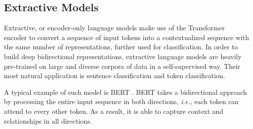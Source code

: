 



\subsection{Extractive Models}

Extractive, or encoder-only language models make use of the Transformer encoder to convert a sequence of input tokens into a contextualized sequence with the same number of representations, further used for classification. In order to build deep bidirectional representations, extractive language models are heavily pre-trained on large and diverse corpora of data in a self-supervised way. Their most natural application is sentence classification and token classification. 

A typical example of such model is \ac{BERT} \citep{devlin2018bert}. \ac{BERT} takes a bidirectional approach by processing the entire input sequence in both directions, \textit{i.e.}, each token can attend to every other token. As a result, it is able to capture context and relationships in all directions. 

